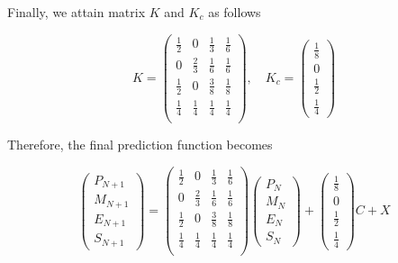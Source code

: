 \documentclass{mcmthesis}
\begin{document}
	Finally, we attain matrix $K$ and $K_c$ as follows
	\begin{spacing}{1.5}
		$$
		K = 
		\left(
		\begin{matrix}
		\frac{1}{2} & 0 & \frac{1}{3} & \frac{1}{6} \\
		0 & \frac{2}{3} & \frac{1}{6} & \frac{1}{6} \\
		\frac{1}{2} & 0 & \frac{3}{8} & \frac{1}{8} \\
		\frac{1}{4} &\frac{1}{4} & \frac{1}{4} & \frac{1}{4} \\
		\end{matrix}
		\right) 
		, \quad K_c = 
		\left(
		\begin{matrix}
		\frac{1}{8} \\ {0} \\ \frac{1}{2} \\ \frac{1}{4}
		\end{matrix}
		\right) 
		$$
	\end{spacing}
	Therefore, the final prediction function becomes
	\begin{spacing}{1.5}
		\begin{equation}
		\left(
		\begin{matrix}
		P_{N+1} \\ M_{N+1} \\ E_{N+1} \\ S_{N+1}
		\end{matrix}
		\right) 
		= 
		\left(
		\begin{matrix}
		\frac{1}{2} & 0 & \frac{1}{3} & \frac{1}{6} \\
		0 & \frac{2}{3} & \frac{1}{6} & \frac{1}{6} \\
		\frac{1}{2} & 0 & \frac{3}{8} & \frac{1}{8} \\
		\frac{1}{4} &\frac{1}{4} & \frac{1}{4} & \frac{1}{4} \\
		\end{matrix}
		\right) 
		\left(
		\begin{matrix}
		P_N \\ M_N \\ E_N \\ S_N
		\end{matrix}
		\right) 
		+
		\left(
		\begin{matrix}
		\frac{1}{8} \\ {0} \\ \frac{1}{2} \\ \frac{1}{4}
		\end{matrix}
		\right) 
		C
		+ X
		\end{equation}
	\end{spacing}	
	
\end{document}
